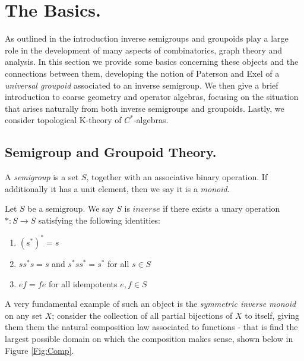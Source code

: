 \chapter{The Basics.}
As outlined in the introduction inverse semigroups and groupoids play a large role in the development of many aspects of combinatorics, graph theory and analysis. In this section we provide some basics concerning these objects and the connections between them, developing the notion of Paterson and Exel of a \textit{universal groupoid} associated to an inverse semigroup. We then give a brief introduction to coarse geometry and operator algebras, focusing on the situation that arises naturally from both inverse semigroups and groupoids. Lastly, we consider topological K-theory of $C^{*}$-algebras.

\section{Semigroup and Groupoid Theory.}

A \textit{semigroup} is a set $S$, together with an associative binary operation. If additionally it has a unit element, then we say it is a \textit{monoid}.

\begin{definition}\label{Def:invsemi}
Let $S$ be a semigroup. We say $S$ is $inverse$ if there exists a unary operation $*:S \rightarrow S$ satisfying the following identities:
\begin{enumerate}
\item $(s^{*})^{*}=s$
\item $ss^{*}s=s$ and $s^{*}ss^{*}=s^{*}$ for all $s \in S$
\item $ef=fe$ for all idempotents $e,f \in S$ 
\end{enumerate}
\end{definition}

A very fundamental example of such an object is the \textit{symmetric inverse monoid} on any set $X$; consider the collection of all partial bijections of $X$ to itself, giving them them the natural composition law associated to functions - that is find the largest possible domain on which the composition makes sense, shown below in Figure \ref{Fig:Comp}.


